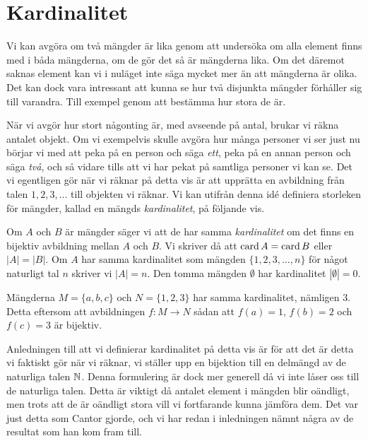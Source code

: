 \section{Kardinalitet}
Vi kan avgöra om två mängder är lika genom att undersöka om alla
element finns med i båda mängderna, om de gör det så är mängderna lika.
Om det däremot saknas element kan vi i nuläget inte säga mycket mer än att
mängderna är olika.
Det kan dock vara intressant att kunna se hur två disjunkta mängder förhåller
sig till varandra.
Till exempel genom att bestämma hur stora de är.

När vi avgör hur stort någonting är, med avseende på antal, brukar vi räkna
antalet objekt.
Om vi exempelvis skulle avgöra hur många personer vi ser just nu börjar vi med
att peka på en person och säga \emph{ett}, peka på en annan person och säga
\emph{två}, och så vidare tills att vi har pekat på samtliga personer vi kan se.
Det vi egentligen gör när vi räknar på detta vis är att upprätta en avbildning
från talen \(1,2,3,\ldots\) till objekten vi räknar.
Vi kan utifrån denna idé definiera storleken för mängder, kallad en mängds
\emph{kardinalitet}, på följande vis.
\begin{definition}\label{def:Kardinalitet}
  Om \(A\) och \(B\) är mängder säger vi att de har samma \emph{kardinalitet}
  om det finns en bijektiv avbildning mellan \(A\) och \(B\).
  Vi skriver då att \(\operatorname{card} A = \operatorname{card} B\) eller \(|A| = |B|\).
  Om \(A\) har samma kardinalitet som mängden \(\{1,2,3,\ldots,n\}\) för
  något naturligt tal \(n\) skriver vi \(|A| = n\).
  Den tomma mängden \(\emptyset\) har kardinalitet \(|\emptyset| = 0\).
\end{definition}

\begin{example}
  Mängderna \(M=\{a,b,c\}\) och \(N=\{1,2,3\}\) har samma kardinalitet,
  nämligen \(3\).
  Detta eftersom att avbildningen \(f\colon M\to N\) sådan att \(f(a)=1\),
  \(f(b)=2\) och \(f(c)=3\) är bijektiv.
\end{example}

Anledningen till att vi definierar kardinalitet på detta vis är för att det är 
detta vi faktiskt gör när vi räknar, vi ställer upp en bijektion till en 
delmängd av de naturliga talen \(\mathbb{N}\).
Denna formulering är dock mer generell då vi inte låser oss till de naturliga 
talen.
Detta är viktigt då antalet element i mängden blir oändligt, men trots att de 
är oändligt stora vill vi fortfarande kunna jämföra dem.
Det var just detta som Cantor gjorde, och vi har redan i inledningen nämnt
några av de resultat som han kom fram till.
